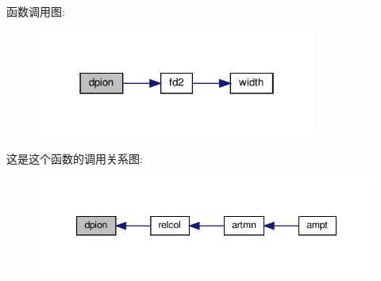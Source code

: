 函数调用图\+:
\nopagebreak
\begin{figure}[H]
\begin{center}
\leavevmode
\includegraphics[width=262pt]{dpion_8f90_a80e35bc38767d9298364ff16bf2d192d_cgraph}
\end{center}
\end{figure}
这是这个函数的调用关系图\+:
\nopagebreak
\begin{figure}[H]
\begin{center}
\leavevmode
\includegraphics[width=347pt]{dpion_8f90_a80e35bc38767d9298364ff16bf2d192d_icgraph}
\end{center}
\end{figure}
